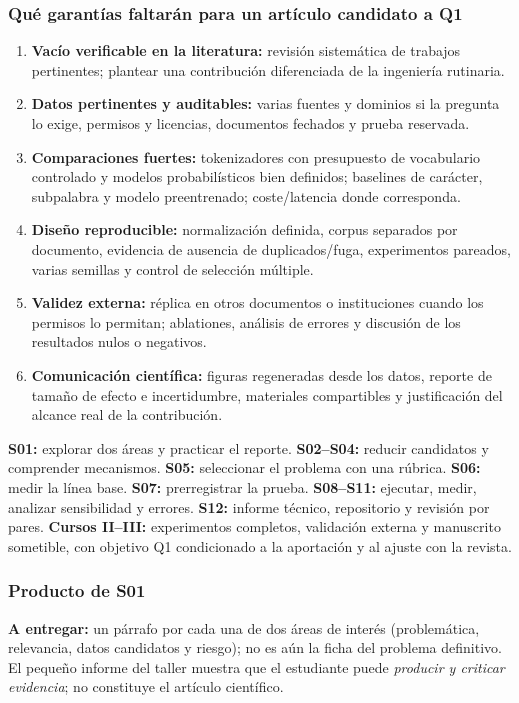 \subsubsection*{Qué garantías faltarán para un artículo candidato a Q1}
\begin{enumerate}
\item \textbf{Vacío verificable en la literatura:} revisión sistemática de trabajos
pertinentes; plantear una contribución diferenciada de la ingeniería rutinaria.
\item \textbf{Datos pertinentes y auditables:} varias fuentes y dominios si la
pregunta lo exige, permisos y licencias, documentos fechados y prueba reservada.
\item \textbf{Comparaciones fuertes:} tokenizadores con presupuesto de vocabulario
controlado y modelos probabilísticos bien definidos; baselines de carácter,
subpalabra y modelo preentrenado; coste/latencia donde corresponda.
\item \textbf{Diseño reproducible:} normalización definida, corpus separados por
documento, evidencia de ausencia de duplicados/fuga, experimentos pareados,
varias semillas y control de selección múltiple.
\item \textbf{Validez externa:} réplica en otros documentos o instituciones
cuando los permisos lo permitan; ablationes, análisis de errores y discusión
de los resultados nulos o negativos.
\item \textbf{Comunicación científica:} figuras regeneradas desde los datos,
reporte de tamaño de efecto e incertidumbre, materiales compartibles y
justificación del alcance real de la contribución.
\end{enumerate}
\begin{puente}
\textbf{S01:} explorar dos áreas y practicar el reporte. \textbf{S02--S04:}
reducir candidatos y comprender mecanismos. \textbf{S05:} seleccionar el
problema con una rúbrica. \textbf{S06:} medir la línea base. \textbf{S07:}
prerregistrar la prueba. \textbf{S08--S11:} ejecutar, medir, analizar
sensibilidad y errores. \textbf{S12:} informe técnico, repositorio y revisión
por pares. \textbf{Cursos II--III:} experimentos completos, validación
externa y manuscrito sometible, con objetivo Q1 condicionado a la
aportación y al ajuste con la revista.
\end{puente}
\subsubsection*{Producto de S01}
\textbf{A entregar:} un párrafo por cada una de dos áreas de interés
(problemática, relevancia, datos candidatos y riesgo); no es aún la ficha
del problema definitivo. El pequeño informe del taller muestra que el
estudiante puede \emph{producir y criticar evidencia}; no constituye el
artículo científico.

